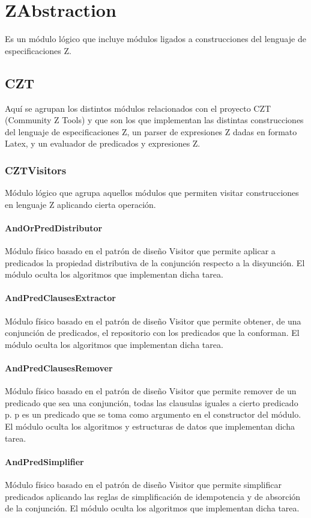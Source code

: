\documentclass[a4paper,10pt]{report}
\begin{document}
	\section{ZAbstraction}
	Es un módulo lógico que incluye módulos ligados a construcciones del lenguaje de especificaciones Z.
		\subsection{CZT}
		Aquí se agrupan los distintos módulos relacionados con el proyecto CZT (Community Z Tools) y que son los que implementan las distintas construcciones del lenguaje de especificaciones Z, un parser de expresiones Z dadas en formato Latex, y un evaluador de predicados y expresiones Z.
			\subsubsection{CZTVisitors}
			Módulo lógico que agrupa aquellos módulos que permiten visitar construcciones en lenguaje Z aplicando cierta operación.
				\paragraph{AndOrPredDistributor}
				Módulo físico basado en el patrón de diseño Visitor que permite aplicar a predicados la propiedad distributiva de la conjunción respecto a la disyunción. El módulo oculta los algoritmos que implementan dicha tarea.
				\paragraph{AndPredClausesExtractor}
				Módulo físico basado en el patrón de diseño Visitor que permite obtener, de una conjunción de predicados, el repositorio con los predicados que la conforman. El módulo oculta los algoritmos que implementan dicha tarea.
				\paragraph{AndPredClausesRemover}
				Módulo físico basado en el patrón de diseño Visitor que permite remover de un predicado que sea una conjunción, todas las clausulas iguales a cierto predicado p. p es un predicado que se toma como argumento en el constructor del módulo. El módulo oculta los algoritmos y estructuras de datos que implementan dicha tarea.
				\paragraph{AndPredSimplifier}
				Módulo físico basado en el patrón de diseño Visitor que permite simplificar predicados aplicando las reglas de simplificación de idempotencia y de absorción de la conjunción. El módulo oculta los algoritmos que implementan dicha tarea.
\end{document}
